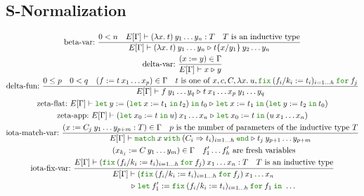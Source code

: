 \documentclass[a4paper,fleqn]{article}
\newcommand{\kwlet}{\mbox{\color{mygreen}\ttfamily let}}
\newcommand{\kwin}{\mbox{\color{mygreen}\ttfamily in}}
\newcommand{\kwmatch}{\mbox{\color{mygreen}\ttfamily match}}
\newcommand{\kwwith}{\mbox{\color{mygreen}\ttfamily with}}
\newcommand{\kwend}{\mbox{\color{mygreen}\ttfamily end}}
\newcommand{\kwfix}{\mbox{\color{mygreen}\ttfamily fix}}
\newcommand{\kwfor}{\mbox{\color{mygreen}\ttfamily for}}
\newcommand{\lam}[2]{\lambda #1.\:#2}
\newcommand{\letin}[3]{\kwlet\:#1:=#2\:\kwin\:#3}
\newcommand{\letinB}[2]{\kwlet\:#1:=#2\:\kwin}
\newcommand{\match}[4]{\kwmatch\:#1\:\kwwith\:(#2 \Rightarrow #3)_{#4}\:\kwend}
\newcommand{\fix}[4]{\kwfix\:(#1 := #2)_{#3}\:\kwfor\:#4}
\newcommand{\subst}[3]{#1\{#2/#3\}}
\newcommand{\reltri}{\mathrel{\triangleright}}
\begin{document}
\subsection{S-Normalization}\label{sec:s-normalization}
\begin{gather*}
  \text{beta-var:}~
    \dfrac{
      0 < n \quad
      E[\Gamma] \vdash (\lam{x}{t})\:y_1\ldots y_n : T \quad
      \text{$T$ is an inductive type}
    }{
      E[\Gamma] \vdash (\lam{x}{t})\:y_1\ldots y_n \reltri \subst{t}{x}{y_1}\:y_2\ldots y_n
    } \\
  \text{delta-var:}~
    \dfrac{(x:=y) \in \Gamma}{E[\Gamma] \vdash x \reltri y} \\
  \text{delta-fun:}~
     \dfrac
     {
       0 \leq p \quad
       0 < q \quad
       (f := t\:x_1\ldots x_p) \in \Gamma \quad
       \text{$t$ is one of $x, c, C, \lam{x}{u}, \fix{f_i/k_i}{t_i}{i=1\ldots h}{f_j}$}
     }{
       E[\Gamma] \vdash f\:y_1\ldots y_q
                        \reltri
                        t\:x_1\ldots x_p\:y_1\ldots y_q
     } \\
  \text{zeta-flat:}~
    E[\Gamma] \vdash \letin{y}{(\letin{x}{t_1}{t_2})}{t_0}
                       \reltri
                       \letin{x}{t_1}{(\letin{y}{t_2}{t_0})} \\
  \text{zeta-app:}~
    E[\Gamma] \vdash
     (\letin{x_0}{t}{u})\:x_1\ldots x_n
     \reltri
     \letin{x_0}{t}{(u\:x_1\ldots x_n)} \\
  \text{iota-match-var:}~
    \dfrac
    {
      (x:=C_j\:y_1\ldots y_{p+m}:T) \in \Gamma \quad
      \text{$p$ is the number of parameters of the inductive type $T$}
    }{
      E[\Gamma] \vdash
      \match{x}{C_i}{t_i}{i=1\ldots h}
      \reltri
      t_j\:y_{p+1}\ldots y_{p+m}
    } \\
  \text{iota-fix-var:}~
    \dfrac
    {
      \begin{gathered}
        (x_{k_j} := C\:y_1\ldots y_m) \in \Gamma \quad
        \text{$f'_1\ldots f'_h$ are fresh variables} \\
        E[\Gamma] \vdash (\fix{f_i/k_i}{t_i}{i=1\ldots h}{f_j})\:x_1\ldots x_n : T \quad
        \text{$T$ is an inductive type}
      \end{gathered}
    }{
      \begin{aligned}
        E[\Gamma] \vdash\; &
          (\fix{f_i/k_i}{t_i}{i=1\ldots h}{f_j})\:x_1\ldots x_n \\
        \reltri\; &
          \begin{aligned}[t]
          & \letinB{f'_1}{\fix{f_i/k_i}{t_i}{i=1\ldots h}{f_1}} ~\ldots \\

\end{aligned}
\end{aligned}}
\end{gather*}
\end{document}
